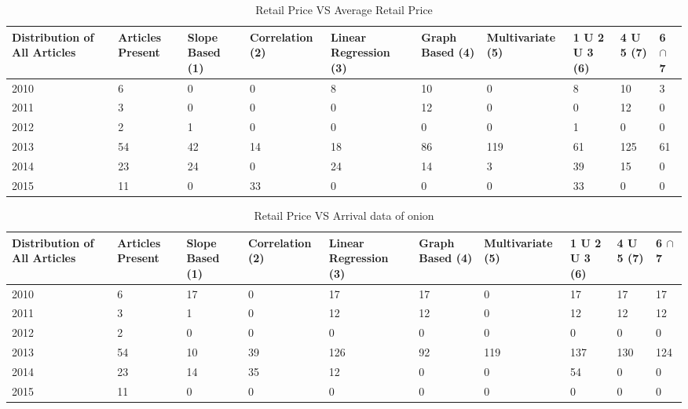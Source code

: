 \documentclass[a4paper,10pt]{report}
\begin{document}
	\begin{table}[]
	\centering
	\resizebox{\textwidth}{!}
	{\begin{tabular}{|l|l|l|l|l|l|l|l|l|l|}
	\hline
	Distribution of All Articles & Articles Present & Slope Based (1) & Correlation (2) & Linear Regression (3) & Graph Based (4) & Multivariate (5) & 1 U 2 U 3 (6) & 4 U 5 (7) & 6 $\cap$ 7 \\
	\hline
	2010 & 6  & 0  & 0  & 8  & 10 & 0   & 8  & 10  & 3  \\
	\hline
	2011 & 3  & 0  & 0  & 0  & 12 & 0   & 0  & 12  & 0  \\
	\hline
	2012 & 2  & 1  & 0  & 0  & 0  & 0   & 1  & 0   & 0  \\
	\hline
	2013 & 54 & 42 & 14 & 18 & 86 & 119 & 61 & 125 & 61 \\
	\hline
	2014 & 23 & 24 & 0  & 24 & 14 & 3   & 39 & 15  & 0  \\
	\hline
	2015 & 11 & 0  & 33 & 0  & 0  & 0   & 33 & 0   & 0  \\
	\hline
	\end{tabular}}	
	\caption{Retail Price VS Average Retail Price}
	\label{RetailVsAverage}
	\end{table}
	
	
	
	\begin{table}[]
	\centering
	\resizebox{\textwidth}{!}
	{\begin{tabular}{|l|l|l|l|l|l|l|l|l|l|}
	\hline
	Distribution of All Articles & Articles Present & Slope Based (1) & Correlation (2) & Linear Regression (3) & Graph Based (4) & Multivariate (5) & 1 U 2 U 3 (6) & 4 U 5 (7) & 6 $\cap$ 7  \\
	\hline
	2010 & 6  & 17 & 0  & 17  & 17 & 0   & 17  & 17  & 17  \\
	\hline
	2011 & 3  & 1  & 0  & 12  & 12 & 0   & 12  & 12  & 12  \\
	\hline
	2012 & 2  & 0  & 0  & 0   & 0  & 0   & 0   & 0   & 0   \\
	\hline
	2013 & 54 & 10 & 39 & 126 & 92 & 119 & 137 & 130 & 124 \\
	\hline
	2014 & 23 & 14 & 35 & 12  & 0  & 0   & 54  & 0   & 0   \\
	\hline
	2015 & 11 & 0  & 0  & 0   & 0  & 0   & 0   & 0   & 0  \\
	\hline
	\end{tabular}}	
	\caption{Retail Price VS Arrival data of onion}
	\label{RetailVsArrival}
	\end{table}
\end{document}
